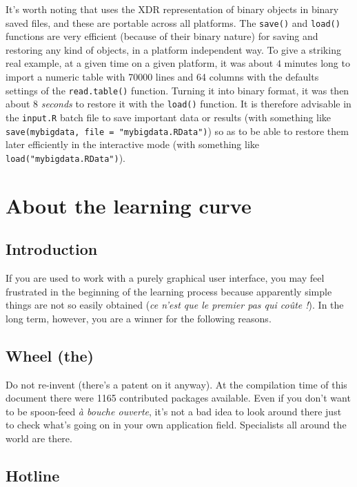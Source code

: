 \documentclass{article}
\begin{document}
It's worth noting that \Rlogo{} uses the XDR representation of binary objects in binary saved files, 
and these are portable across all \Rlogo{} platforms. The \texttt{save()} and \texttt{load()}
functions are very efficient (because of their binary nature) for saving and restoring any 
kind of \Rlogo{} objects, in a platform independent way. To give a striking real example, at a given time
on a given platform, it was about $4$ minutes long to import a numeric table with 70000 lines and 64 columns
with the defaults settings of the \texttt{read.table()} function. Turning it into binary format,
it was then about $8$ \emph{seconds} to restore it with the \texttt{load()} function.
It is therefore advisable in the \texttt{input.R} batch file to save important data or
results (with something like \texttt{save(mybigdata, file = "mybigdata.RData")})
so as to be able to restore them later efficiently in the interactive mode (with something
like \texttt{load("mybigdata.RData")}).


\section{About the learning curve}

\subsection*{Introduction}

If you are used to work with a purely graphical user interface, you may feel frustrated in the
beginning of the learning process because apparently simple things are not so easily
obtained (\textit{ce n'est que le premier pas qui co{\^{u}te} !}).
In the long term, however, you are a winner for the following reasons.

\subsection{Wheel (the)}

Do not re-invent (there's a patent \cite{wheel} on it anyway).
At the compilation time of this document there were 
1165
contributed packages available. Even if you don't want to be spoon-feed 
\textit{{\`a} bouche ouverte}, 
it's not a bad
idea to look around there just to check what's going on in your own application field.
Specialists all around the world are there.

\subsection{Hotline}
\end{document}
